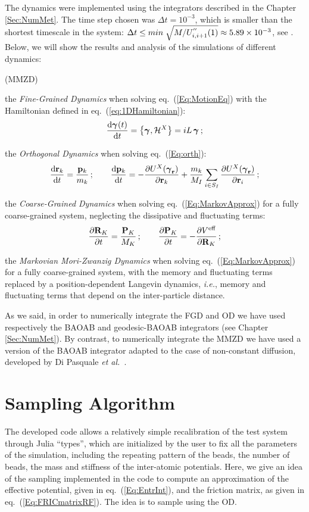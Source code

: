 \documentclass[10pt,a4paper]{book}
\theoremstyle{definition}
\begin{document}
The dynamics were implemented using the integrators described in the Chapter \ref{Sec:NumMet}. The time step chosen was $\Delta t=10^{-3}$, which is smaller than the shortest timescale in the system: $\Delta t \leq min\;\sqrt{M/U^{''}_{i,i+1}(1)}\approx 5.89 \times 10^{-3}$, see \cite{DiPasquale2019}.   
Below, we will show the results and analysis of the simulations of different dynamics:
\begin{labeling}{(MMZD)}
\item[(FGD)] the \emph{Fine-Grained Dynamics} when solving eq.~(\ref{Eq:MotionEq}) with the Hamiltonian defined in eq.~(\ref{eq:1DHamiltonian}):
 \[
 \frac{\mbox{d}\boldsymbol\gamma_{}(t)}{\mbox{d}t} = \left\lbrace \boldsymbol\gamma_{},\mathcal{H}^X\right\rbrace = iL\,\boldsymbol\gamma_{}\,;
 \]
\item[(OD)] the \emph{Orthogonal Dynamics} when solving eq.~(\ref{Eq:orth}):
 \[
  \frac{\mbox{d}\mathbf{r}_k}{\mbox{d}t} = \frac{\mathbf{p}_k}{m_{k}}\,;\qquad
  \frac{\mbox{d}\mathbf{p}_k}{\mbox{d}t} = - \frac{\partial U^X(\boldsymbol\gamma_{\mathbf{r}})}{\partial\mathbf{r}_k} + \frac{m_k}{M_I}\sum_{i\in S_I}\frac{\partial U^X(\boldsymbol\gamma_{\mathbf{r}})}{\partial\mathbf{r}_i}\,; 
 \]
\item[(CGD)] the \emph{Coarse-Grained Dynamics} when solving eq.~(\ref{Eq:MarkovApprox}) for a fully coarse-grained system, neglecting the dissipative and fluctuating terms:
 \[
 \frac{\partial\mathbf{R}_{K}}{\partial t} = \frac{\mathbf{P}_{K}}{M_{K}}\,; \qquad
 \frac{\partial\mathbf{P}_{K}}{\partial t} = -\frac{\partial V^{\mathrm{eff}}}{\partial\mathbf{R}_{K}}\,;  
 \]
\item[(MMZD)] the \emph{Markovian Mori-Zwanzig Dynamics} when solving eq.~(\ref{Eq:MarkovApprox}) for a fully coarse-grained system, with the memory and fluctuating terms replaced by a position-dependent Langevin dynamics, \textit{i.e.}, memory and fluctuating terms that depend on the inter-particle distance.
\end{labeling}
As we said, in order to numerically integrate the FGD and OD we have used respectively the BAOAB and geodesic-BAOAB integrators (see Chapter \ref{Sec:NumMet}). By contrast, to numerically integrate the MMZD we have used a version of the BAOAB integrator adapted to the case of non-constant diffusion, developed by Di Pasquale \textit{et al.}~\cite{DiPasquale2019}. 

\section{Sampling Algorithm}

The developed code allows a relatively simple recalibration of the test system through Julia ``types'', which are initialized by the user to fix all the parameters of the simulation, including the repeating pattern of the beads, the number of beads, the mass and stiffness of the inter-atomic potentials.
Here, we give an idea of the sampling implemented in the code to compute an approximation of the effective potential, given in eq.~(\ref{Eq:EntrInt}), and the friction matrix, as given in eq.~(\ref{Eq:FRICmatrixRF}). The idea is to sample using the OD.
\end{document}
